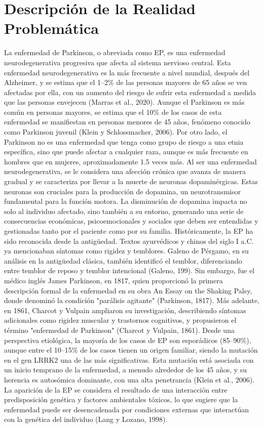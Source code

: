 \documentclass[listof=nochaptergap,12pt,times,authoryear]{report}
\begin{document}
\section{Descripción de la Realidad Problemática}
La enfermedad de Parkinson, o abreviada como EP, es una enfermedad neurodegenerativa progresiva que afecta al sistema nervioso central. Esta enfermedad neurodegenerativa es la más frecuente a nivel mundial, después del Alzheimer, y se estima que el 1–2\% de las personas mayores de 65 años se ven afectadas por ella, con un aumento del riesgo de sufrir esta enfermedad a medida que las personas envejecen (Marras et al., 2020). Aunque el Parkinson es más común en personas mayores, se estima que el 10\% de los casos de esta enfermedad se manifiestan en personas menores de 45 años, fenómeno conocido como Parkinson juvenil (Klein y Schlossmacher, 2006). Por otro lado, el Parkinson no es una enfermedad que tenga como grupo de riesgo a una etnia específica, sino que puede afectar a cualquier raza, aunque es más frecuente en hombres que en mujeres, aproximadamente 1.5 veces más.
Al ser una enfermedad neurodegenerativa, se le considera una afección crónica que avanza de manera gradual y se caracteriza por llevar a la muerte de neuronas dopaminérgicas. Estas neuronas son cruciales para la producción de dopamina, un neurotransmisor fundamental para la función motora. La disminución de dopamina impacta no solo al individuo afectado, sino también a su entorno, generando una serie de consecuencias económicas, psicoemocionales y sociales que deben ser entendidas y gestionadas tanto por el paciente como por su familia.
Históricamente, la EP ha sido reconocida desde la antigüedad. Textos ayurvédicos y chinos del siglo I a.C. ya mencionaban síntomas como rigidez y temblores. Galeno de Pérgamo, en su análisis en la antigüedad clásica, también identificó el temblor, diferenciando entre temblor de reposo y temblor intencional (Galeno, 199). Sin embargo, fue el médico inglés James Parkinson, en 1817, quien proporcionó la primera descripción formal de la enfermedad en su obra An Essay on the Shaking Palsy, donde denominó la condición "parálisis agitante" (Parkinson, 1817). Más adelante, en 1861, Charcot y Vulpain ampliaron su investigación, describiendo síntomas adicionales como rigidez muscular y trastornos cognitivos, y propusieron el término "enfermedad de Parkinson" (Charcot y Vulpain, 1861).
Desde una perspectiva etiológica, la mayoría de los casos de EP son esporádicos (85–90\%), aunque entre el 10–15\% de los casos tienen un origen familiar, siendo la mutación en el gen LRRK2 una de las más significativas. Esta mutación está asociada con un inicio temprano de la enfermedad, a menudo alrededor de los 45 años, y su herencia es autosómica dominante, con una alta penetrancia (Klein et al., 2006). La aparición de la EP se considera el resultado de una interacción entre predisposición genética y factores ambientales tóxicos, lo que sugiere que la enfermedad puede ser desencadenada por condiciones externas que interactúan con la genética del individuo (Lang y Lozano, 1998).
\end{document}
